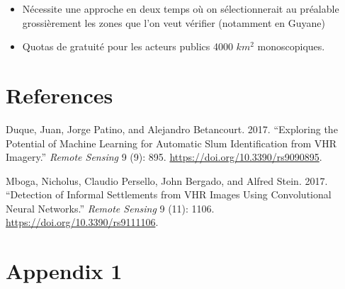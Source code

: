 \documentclass[
  letterpaper,
  DIV=11,
  numbers=noendperiod]{scrreprt}
\providecommand{\tightlist}{%
  \setlength{\itemsep}{0pt}\setlength{\parskip}{0pt}}\usepackage{longtable,booktabs,array}
\newlength{\cslhangindent}
\newlength{\cslentryspacingunit} %
\newenvironment{CSLReferences}[2] %
 {%
  \setlength{\parindent}{0pt}
  \ifodd #1
  \let\oldpar\par
  \def\par{\hangindent=\cslhangindent\oldpar}
  \fi
  \setlength{\parskip}{#2\cslentryspacingunit}
 }%
 {}
\begin{document}
\begin{itemize}
\tightlist
\item
  Nécessite une approche en deux temps où on sélectionnerait au
  préalable grossièrement les zones que l'on veut vérifier (notamment en
  Guyane)
\item
  Quotas de gratuité pour les acteurs publics 4000 \(km^2\)
  monoscopiques.
\end{itemize}


\hypertarget{references}{%
\chapter*{References}\label{references}}


\hypertarget{refs}{}
\begin{CSLReferences}{1}{0}
\leavevmode{}%
Duque, Juan, Jorge Patino, and Alejandro Betancourt. 2017. {``Exploring
the {Potential} of {Machine} {Learning} for {Automatic} {Slum}
{Identification} from {VHR} {Imagery}.''} \emph{Remote Sensing} 9 (9):
895. \url{https://doi.org/10.3390/rs9090895}.

\leavevmode{}%
Mboga, Nicholus, Claudio Persello, John Bergado, and Alfred Stein. 2017.
{``Detection of {Informal} {Settlements} from {VHR} {Images} {Using}
{Convolutional} {Neural} {Networks}.''} \emph{Remote Sensing} 9 (11):
1106. \url{https://doi.org/10.3390/rs9111106}.

\end{CSLReferences}

\cleardoublepage
{}
{}
\appendix

\hypertarget{appendix-1}{%
\chapter{Appendix 1}\label{appendix-1}}
\end{document}
